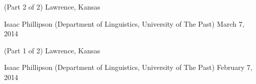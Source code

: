 

\vspace{1ex}

\begin{changemargin}{-0.3in}{0in}
\begin{etaremune}
%

\item
\headedsection %
{ (Part 2 of 2)}
{Lawrence, Kansas} {

\headedsubsection %
{Isaac Phillipson \textnormal{(Department of Linguistics, University of
    The Past)}}
{March 7, 2014}
{\vspace{-\baselineskip}}
}

\item
\headedsection %
{ (Part 1 of 2)}
{Lawrence, Kansas} {

\headedsubsection %
{Isaac Phillipson \textnormal{(Department of Linguistics, University of
    The Past)}}
{February 7, 2014}
{\vspace{-\baselineskip}}
}


\end{etaremune}
\end{changemargin}


\spacedhrule{0.5em}{-0.4em} %
